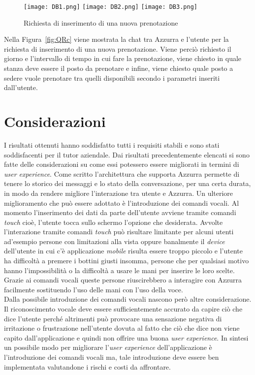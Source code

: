 \begin{figure}[h]
	\begin{center}
		\texttt{[image: DB1.png]}\hfill
		\texttt{[image: DB2.png]}\hfill
		\texttt{[image: DB3.png]}
		\caption{Richiesta di inserimento di una nuova prenotazione}\label{fig:DB}
	\end{center}
\end{figure}
\clearpage
Nella Figura~\ref{fig:QRc} viene mostrata la chat tra Azzurra e l'utente per la richiesta di inserimento di una nuova prenotazione. Viene perciò richiesto il giorno e l'intervallo di tempo in cui fare la prenotazione, viene chiesto in quale stanza deve essere il posto da prenotare e infine, viene chiesto quale posto a sedere vuole prenotare tra quelli disponibili secondo i parametri inseriti dall'utente.

\section{Considerazioni}
I risultati ottenuti hanno soddisfatto tutti i requisiti stabili e sono stati soddisfacenti per il tutor aziendale. Dai risultati precedentemente elencati si sono fatte delle considerazioni su come essi potessero essere migliorati in termini di \emph{user experience}. Come scritto l'architettura che supporta Azzurra permette di tenere lo storico dei messaggi e lo stato della conversazione, per una certa durata, in modo da rendere migliore l'interazione tra utente e Azzurra. Un ulteriore miglioramento che può essere adottato è l'introduzione dei comandi vocali. Al momento l'inserimento dei dati da parte dell'utente avviene tramite comandi \emph{touch} cioè, l'utente tocca sullo schermo l'opzione che desiderata. Avvolte l'interazione tramite comandi \emph{touch} può risultare limitante per alcuni utenti ad'esempio persone con limitazioni alla vista oppure banalmente il \emph{device} dell'utente in cui c'è applicazione \emph{mobile} risulta essere troppo piccolo e l'utente ha difficoltà a premere i bottini giusti insomma, persone che per qualsiasi motivo hanno l'impossibilità o la difficoltà a usare le mani per inserire le loro scelte. Grazie ai comandi vocali queste persone riuscirebbero a interagire con Azzurra facilmente sostituendo l'uso delle mani con l'uso della voce. \\

Dalla possibile introduzione dei comandi vocali nascono però altre considerazione. Il riconoscimento vocale deve essere sufficientemente accurato da capire ciò che dice l'utente perché altrimenti può provocare una sensazione negativa di irritazione o frustrazione nell'utente dovuta al fatto che ciò che dice non viene capito dall'applicazione e quindi non offrire una buona \emph{user experience}. In sintesi un possibile modo per migliorare l'\emph{user experience} dell'applicazione è l'introduzione dei comandi vocali ma, tale introduzione deve essere ben implementata valutandone i rischi e costi da affrontare.

